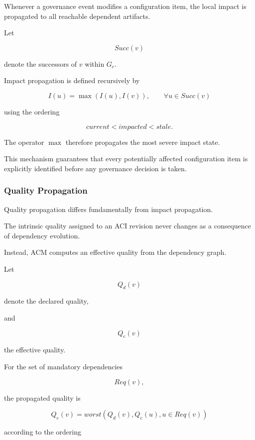 \documentclass[10pt]{article}
\begin{document}
Whenever a governance event modifies a configuration item, the local impact is
propagated to all reachable dependent artifacts.

Let

\[
Succ(v)
\]

denote the successors of
$v$
within
$G_c$.

Impact propagation is defined recursively by

\begin{equation}
I(u)
=
\max
\left(
I(u),
I(v)
\right),
\qquad
\forall
u\in Succ(v)
\label{eq:impact_propagation}
\end{equation}

using the ordering

\[
current
<
impacted
<
stale.
\]

The operator
$\max$
therefore propagates the most severe impact state.

This mechanism guarantees that every potentially affected configuration item is
explicitly identified before any governance decision is taken.

\subsubsection{Quality Propagation}

Quality propagation differs fundamentally from impact propagation.

The intrinsic quality assigned to an ACI revision never changes as a
consequence of dependency evolution.

Instead, ACM computes an effective quality from the dependency graph.

Let

\[
Q_d(v)
\]

denote the declared quality,

and

\[
Q_e(v)
\]

the effective quality.

For the set of mandatory dependencies

\[
Req(v),
\]

the propagated quality is

\begin{equation}
Q_e(v)
=
worst
\left(
Q_d(v),
Q_e(u),
u\in Req(v)
\right)
\label{eq:quality_propagation}
\end{equation}

according to the ordering
\end{document}
